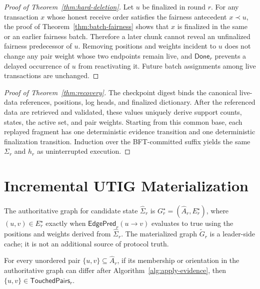 \begin{proof}[Proof of Theorem~\ref{thm:hard-deletion}]
Let $u$ be finalized in round $r$.  For any transaction $x$ whose honest
receive order satisfies the fairness antecedent $x\prec u$, the proof of
Theorem~\ref{thm:batch-fairness} shows that $x$ is finalized in the same or
an earlier fairness batch.  Therefore a later chunk cannot reveal an
unfinalized fairness predecessor of $u$.  Removing positions and weights
incident to $u$ does not change any pair weight whose two endpoints remain
live, and $\mathsf{Done}_r$ prevents a delayed occurrence of $u$ from
reactivating it.  Future batch assignments among live transactions are
unchanged.
\end{proof}

\begin{proof}[Proof of Theorem~\ref{thm:recovery}]
The checkpoint digest binds the canonical live-data references, positions, log
heads, and finalized dictionary.  After the referenced data are retrieved and
validated, these values uniquely derive support counts, states,
the active set, and pair weights.  Starting from this common base, each replayed
fragment has one deterministic evidence transition and one deterministic
finalization transition.  Induction over the BFT-committed suffix yields the
same $\Sigma_r$ and $h_r$ as uninterrupted execution.
\end{proof}

\section{Incremental UTIG Materialization}
\label{app:incremental-materialization}

The authoritative graph for candidate state $\widehat\Sigma_r$ is
$G_r^\star=(\widehat A_r,E_r^\star)$, where
$(u,v)\in E_r^\star$ exactly when
$\mathsf{EdgePred}_r(u\to v)$ evaluates to true using the positions and
weights derived from $\widehat\Sigma_r$.  The materialized graph
$\widetilde G_r$ is a leader-side cache; it is not an additional source of
protocol truth.

\begin{lemma}
\label{lem:touched-pair-completeness}
For every unordered pair $\{u,v\}\subseteq\widehat A_r$, if its membership or
orientation in the authoritative graph can differ after
Algorithm~\ref{alg:apply-evidence}, then
$\{u,v\}\in\mathsf{TouchedPairs}_r$.
\end{lemma}

